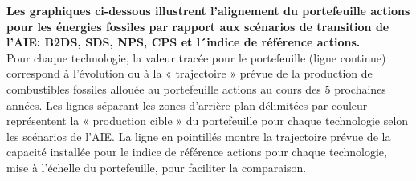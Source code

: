 \documentclass[10pt,table,a4]{article}\usepackage[]{graphicx}\usepackage[]{color}
\begin{document}
	\begin{multicols}{2}
		\textbf{Les graphiques ci-dessous illustrent l'alignement du portefeuille actions pour les énergies fossiles par rapport aux scénarios de transition de l'AIE: B2DS, SDS, NPS, CPS et l´indice de référence actions.}\\ 
		Pour chaque technologie, la valeur tracée pour le portefeuille (ligne continue) correspond à l'évolution ou à la « trajectoire » prévue de la production de combustibles fossiles allouée au portefeuille actions au cours des 5 prochaines années. 
		Les lignes séparant les zones d'arrière-plan délimitées par couleur représentent la « production cible » du portefeuille pour chaque technologie selon les scénarios de l'AIE. La ligne en pointillés montre la trajectoire prévue de la capacité installée pour le indice de référence actions pour chaque technologie, mise à l'échelle du portefeuille, pour faciliter la comparaison.
	\end{multicols}		

	
\end{document}
